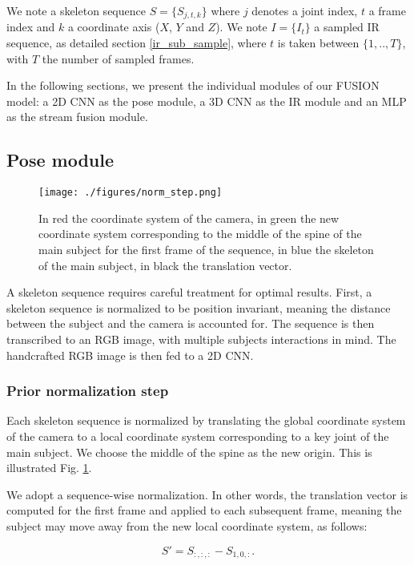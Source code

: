 \documentclass[letterpaper, 10 pt, conference]{ieeeconf}
\begin{document}
We note a skeleton sequence $S = \{S_{j,t,k}\}$ where $j$ denotes a joint index, $t$ a frame index and $k$ a coordinate axis ($X$, $Y$ and $Z$). We note $I = \{I_{t}\}$ a sampled IR sequence, as detailed section \ref{ir_sub_sample}, where $t$ is taken between $\{1, .., T\}$, with $T$ the number of sampled frames.

In the following sections, we present the individual modules of our FUSION model: a 2D CNN as the pose module, a 3D CNN as the IR module and an MLP as the stream fusion module. 

\subsection{Pose module}

\begin{figure}[t]
  \centering
  \texttt{[image: ./figures/norm\_step.png]}
  \caption{In red the coordinate system of the camera, in green the new coordinate system corresponding to the middle of the spine of the main subject for the first frame of the sequence, in blue the skeleton of the main subject, in black the translation vector.}
  \label{prior_norm_step}
\end{figure}

A skeleton sequence requires careful treatment for optimal results. First, a skeleton sequence is normalized to be position invariant, meaning the distance between the subject and the camera is accounted for. The sequence is then transcribed to an RGB image, with multiple subjects interactions in mind. The handcrafted RGB image is then fed to a 2D CNN. 

\subsubsection{Prior normalization step}

Each skeleton sequence is normalized by translating the global coordinate system of the camera to a local coordinate system corresponding to a key joint of the main subject. We choose the middle of the spine as the new origin. This is illustrated Fig. \ref{prior_norm_step}.

We adopt a sequence-wise normalization. In other words, the translation vector is computed for the first frame and applied to each subsequent frame, meaning the subject may move away from the new local coordinate system, as follows:

\begin{equation}
S' = S_{:, :, :} - S_{1, 0, :}.
\end{equation}
\end{document}
